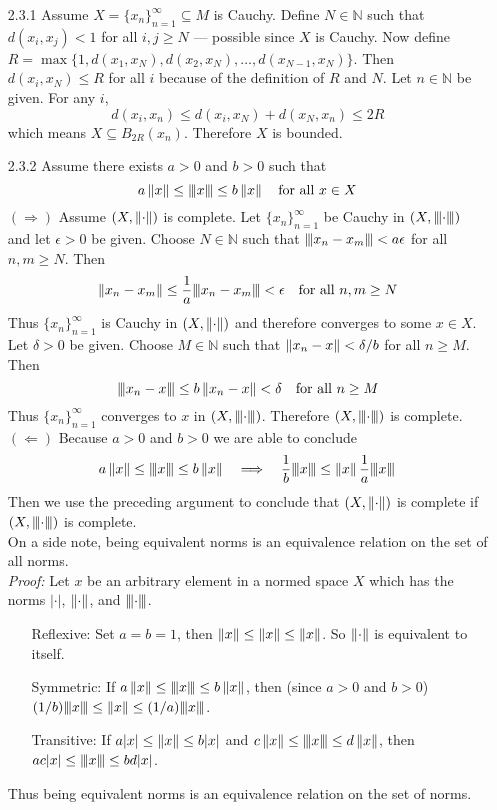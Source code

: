 \documentclass[../../Solutions.tex]{subfiles}
\begin{document}
\begin{itemize}
	\item [2.3.1] Assume $X=\{x_n\}_{n=1}^\infty \subseteq M$ is Cauchy.
		Define $N \in \mathbb{N}$ such that $d(x_i,x_j) < 1$ for all $i,j \geq N$ --- possible since $X$ is Cauchy.
		Now define $R = \max\{ 1 , d(x_1,x_N) , d(x_2,x_N) , \dots , d(x_{N-1},x_N) \}$.
		Then $d(x_i, x_N) \leq R$ for all $i$ because of the definition of $R$ and $N$.
		Let $n \in \mathbb{N}$ be given.
		For any $i$,
		$$ d(x_i,x_n) \leq d(x_i,x_N)+d(x_N,x_n) \leq 2R $$
		which means $X \subseteq B_{2R}(x_n)$. Therefore $X$ is bounded.
	
	\item [2.3.2] Assume there exists $a > 0$ and $b > 0$ such that
		$$ a\norm{x} \leq \inorm{x} \leq b\norm{x} \quad \text{for all } x \in X $$
		$(\Rightarrow)$ Assume $(X,\norm{\cdot})$ is complete.
		Let $\{x_n\}_{n=1}^\infty$ be Cauchy in $(X,\inorm{\cdot})$ and let $\epsilon > 0$ be given.
		Choose $N \in \mathbb{N}$ such that $\inorm{x_n - x_m} < a\epsilon$ for all $n,m \geq N$.
		Then
		$$ \norm{x_n - x_m} \leq \frac{1}{a}\inorm{x_n - x_m} < \epsilon  \quad \text{for all } n,m \geq N $$
		Thus $\{x_n\}_{n=1}^\infty$ is Cauchy in $(X,\norm{\cdot})$ and therefore converges to some $x \in X$.
		Let $\delta > 0$ be given.
		Choose $M \in \mathbb{N}$ such that $\norm{x_n - x} < \delta/b$ for all $n \geq M$.
		Then
		$$ \inorm{x_n - x} \leq b\norm{x_n - x} < \delta \quad \text{for all } n \geq M $$
		Thus $\{x_n\}_{n=1}^\infty$ converges to $x$ in $(X,\inorm{\cdot})$.
		Therefore $(X,\inorm{\cdot})$ is complete. \\
		$(\Leftarrow)$ Because $a > 0$ and $b > 0$ we are able to conclude
		$$ a\norm{x} \leq \inorm{x} \leq b\norm{x} \quad\Longrightarrow\quad \frac{1}{b}\inorm{x} \leq \norm{x} \frac{1}{a}\inorm{x} $$
		Then we use the preceding argument to conclude that $(X,\norm{\cdot})$ is complete if $(X,\inorm{\cdot})$ is complete. \\
		On a side note, being equivalent norms is an equivalence relation on the set of all norms. \\
		\textit{Proof:} Let $x$ be an arbitrary element in a normed space $X$ which has the norms $|\cdot|$, $\norm{\cdot}$, and $\inorm{\cdot}$.
		\begin{itemize}
			\item [Reflexive:] Set $a = b = 1$, then $\norm{x} \leq \norm{x} \leq \norm{x}$.
				So $\norm{\cdot}$ is equivalent to itself.
			\item [Symmetric:] If $a\norm{x} \leq \inorm{x} \leq b\norm{x}$, then (since $a > 0$ and $b > 0$) $(1/b)\inorm{x} \leq \norm{x} \leq (1/a)\inorm{x}$.
			\item [Transitive:] If $a|x| \leq \norm{x} \leq b|x|$ and $c\norm{x} \leq \inorm{x} \leq d\norm{x}$, then $ac|x| \leq \inorm{x} \leq bd|x|$.
		\end{itemize}
		Thus being equivalent norms is an equivalence relation on the set of norms.
	

\end{itemize}
\end{document}
